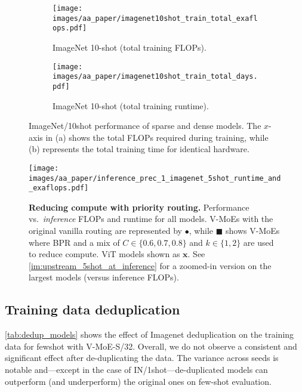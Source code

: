 \documentclass{article}
\newcommand{\abbv}{{V-MoE}}
\begin{document}
\begin{figure}
\centering
\begin{subfigure}{.50\textwidth}
  \centering
  \texttt{[image: images/aa\_paper/imagenet10shot\_train\_total\_exaflops.pdf]}
  \caption{ImageNet 10-shot (total training FLOPs).}
  \label{im:fewshot_10_flops}
\end{subfigure}\begin{subfigure}{.50\textwidth}
  \centering
  \texttt{[image: images/aa\_paper/imagenet10shot\_train\_total\_days.pdf]}
  \caption{ImageNet 10-shot (total training runtime).}
  \label{im:fewshot_10_runtime}
\end{subfigure}
\caption{
ImageNet/10shot performance of sparse and dense models.
The $x$-axis in (a) shows the total FLOPs required during training, while (b) represents the total training time for identical hardware.
}
\label{im:fewshot_10_flops_and_runtime}
\end{figure}







\begin{figure}
\centering
\texttt{[image: images/aa\_paper/inference\_prec\_1\_imagenet\_5shot\_runtime\_and\_exaflops.pdf]}
\caption{\textbf{Reducing compute with priority routing.} Performance vs.\ \emph{inference} FLOPs and runtime for all models.
\abbv{}s with the original vanilla routing are represented by $\bullet$, while $\blacksquare$ shows \abbv{}s where BPR and a mix of ${C \in \{0.6, 0.7, 0.8\}}$ and ${k \in \{1, 2\}}$ are used to reduce compute. 
ViT models shown as $\mathbf{x}$.
See \cref{im:upstream_5shot_at_inference} for a zoomed-in version on the largest models (versus inference FLOPs).\label{im:upstream_5shot_at_inference_all}}\label{im:inference_vs_runtime}
\end{figure}


\subsection{Training data deduplication}\label{sec:dedup_models}

\cref{tab:dedup_models} shows the effect of Imagenet deduplication on the training data for fewshot with \abbv{}-S/32.
Overall, we do not observe a consistent and significant effect after de-duplicating the data.
The variance across seeds is notable and---except in the case of IN/1shot---de-duplicated models can outperform (and underperform) the original ones on few-shot evaluation.
\end{document}
